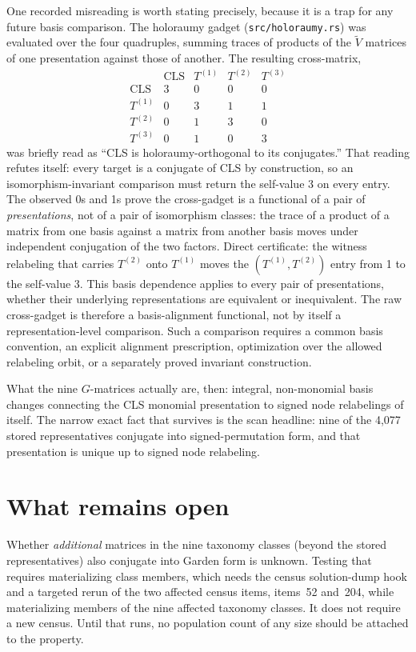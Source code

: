 \documentclass[11pt]{article}
\newcommand{\pathcode}[1]{\nolinkurl{#1}}
\begin{document}
One recorded misreading is worth stating precisely, because it is a trap for
any future basis comparison.  The holoraumy gadget
(\pathcode{src/holoraumy.rs}) was evaluated over the four quadruples,
summing traces of products of the $\widetilde{V}$ matrices of one
presentation against those of another.  The resulting cross-matrix,
\[
  \begin{array}{c|cccc}
      & \text{CLS} & T^{(1)} & T^{(2)} & T^{(3)} \\ \hline
    \text{CLS}   & 3 & 0 & 0 & 0 \\
    T^{(1)}      & 0 & 3 & 1 & 1 \\
    T^{(2)}      & 0 & 1 & 3 & 0 \\
    T^{(3)}      & 0 & 1 & 0 & 3
  \end{array}
\]
was briefly read as ``CLS is holoraumy-orthogonal to its conjugates.''  That
reading refutes itself: every target is a conjugate of CLS by construction,
so an isomorphism-invariant comparison must return the self-value 3 on every
entry.  The observed 0s and 1s prove the cross-gadget is a functional of a
pair of \emph{presentations}, not of a pair of isomorphism classes: the trace
of a product of a matrix from one basis against a matrix from another basis
moves under independent conjugation of the two factors.  Direct certificate:
the witness relabeling that carries $T^{(2)}$ onto $T^{(1)}$ moves the
$(T^{(1)}, T^{(2)})$ entry from 1 to the self-value 3.  This basis dependence
applies to every pair of presentations, whether their underlying
representations are equivalent or inequivalent.  The raw cross-gadget is
therefore a basis-alignment functional, not by itself a representation-level
comparison.  Such a comparison requires a common basis convention, an
explicit alignment prescription, optimization over the allowed relabeling
orbit, or a separately proved invariant construction.

What the nine $G$-matrices actually are, then: integral, non-monomial basis
changes connecting the CLS monomial presentation to signed node relabelings
of itself.  The narrow
exact fact that survives is the scan headline: nine of
the 4{,}077 stored representatives conjugate into signed-permutation form,
and that presentation is unique up to signed node relabeling.

\section{What remains open}

Whether \emph{additional} matrices in the nine taxonomy classes (beyond the
stored representatives) also conjugate into Garden form is unknown.  Testing
that requires materializing class members, which needs the census
solution-dump hook and a targeted rerun of the two affected census items,
items~52 and~204, while materializing members of the nine affected taxonomy
classes.  It does not require a new census.  Until that runs, no population
count of any size should be attached to the property.
\end{document}
